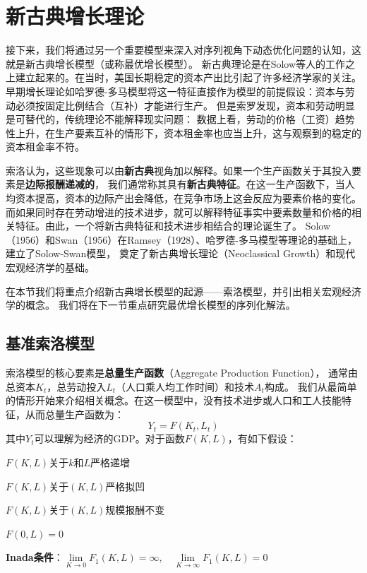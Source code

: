 
\section{新古典增长理论} \label{sec-ngm}

接下来，我们将通过另一个重要模型来深入对序列视角下动态优化问题的认知，这就是新古典增长模型（或称最优增长模型）。
新古典理论是在Solow等人的工作之上建立起来的。在当时，美国长期稳定的资本产出比引起了许多经济学家的关注。
早期增长理论如哈罗德-多马模型将这一特征直接作为模型的前提假设：资本与劳动必须按固定比例结合（互补）才能进行生产。
但是索罗发现，资本和劳动明显是可替代的，传统理论不能解释现实问题：
数据上看，劳动的价格（工资）趋势性上升，在生产要素互补的情形下，资本租金率也应当上升，这与观察到的稳定的资本租金率不符。

索洛认为，这些现象可以由\textbf{新古典}视角加以解释。如果一个生产函数关于其投入要素是\textbf{边际报酬递减的}，
我们通常称其具有\textbf{新古典特征}。在这一生产函数下，当人均资本提高，资本的边际产出会降低，在竞争市场上这会反应为要素价格的变化。
而如果同时存在劳动增进的技术进步，就可以解释特征事实中要素数量和价格的相关特征。由此，一个将新古典特征和技术进步相结合的理论诞生了。
Solow（1956）和Swan（1956）在Ramsey（1928）、哈罗德-多马模型等理论的基础上，建立了Solow-Swan模型，
奠定了新古典增长理论（Neoclassical Growth）和现代宏观经济学的基础。

在本节我们将重点介绍新古典增长模型的起源——索洛模型，并引出相关宏观经济学的概念。
我们将在下一节重点研究最优增长模型的序列化解法。


\subsection{基准索洛模型}

索洛模型的核心要素是\textbf{总量生产函数}（Aggregate Production Function），
通常由总资本$K_t$，总劳动投入$L_t$（人口乘人均工作时间）和技术$A_t$构成。
我们从最简单的情形开始来介绍相关概念。在这一模型中，没有技术进步或人口和工人技能特征，从而总量生产函数为：
\begin{equation*}
    Y_t = F\left(K_t, L_t\right)
\end{equation*}
其中$Y_t$可以理解为经济的GDP。对于函数$F(K, L)$，有如下假设：
\begin{assumption}  \label{as-F-increase}
    $F(K, L)$关于$k$和$L$严格递增
\end{assumption}
\begin{assumption}  \label{as-F-quasiconcave}
    $F(K, L)$关于$(K, L)$严格拟凹
\end{assumption}
\begin{assumption}  \label{as-F-cosntant}
    $F(K, L)$关于$(K, L)$规模报酬不变
\end{assumption}
\begin{assumption}  \label{as-F-zero}
    $F(0, L)=0$
\end{assumption}
\begin{assumption}  \label{as-F-inada}
    \textbf{Inada条件}：$\lim\limits_{K\rightarrow 0}F_1(K, L)
        = \infty, \quad \lim\limits_{K\rightarrow \infty}F_1(K, L)=0$
\end{assumption}

